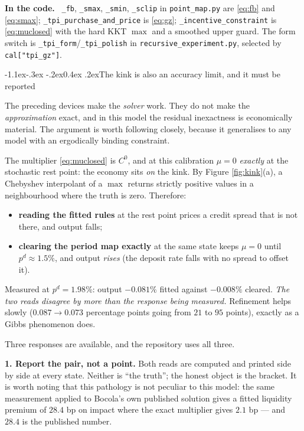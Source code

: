 \documentclass[10pt,a4paper]{article}
\makeatletter
\theoremstyle{definition}
\theoremstyle{plain}
\theoremstyle{remark}
\newenvironment{codehint}%
  {\par\vspace{2pt}\begin{framed}\noindent\small\textcolor{codeblue}{\textbf{In the code.}}\ }%
  {\end{framed}\vspace{2pt}}
\newcommand{\file}[1]{\textcolor{codeblue}{\texttt{#1}}}
\newcommand{\code}[1]{\texttt{#1}}
\renewcommand\subsection{\@startsection{subsection}{2}{\z@}%
  {-1.1ex\@plus -.3ex \@minus -.2ex}{0.4ex \@plus .2ex}{\normalfont\normalsize\bfseries}}
\makeatother
\begin{document}
\begin{codehint}
\code{\_fb}, \code{\_smax}, \code{\_smin}, \code{\_sclip} in \file{point\_map.py} are
\eqref{eq:fb} and \eqref{eq:smax}; \code{\_tpi\_purchase\_and\_price} is \eqref{eq:gz};
\code{\_incentive\_constraint} is \eqref{eq:muclosed} with the hard KKT $\max$ and a smoothed
upper guard. The form switch is \code{\_tpi\_form}/\code{\_tpi\_polish} in
\file{recursive\_experiment.py}, selected by \code{cal["tpi\_gz"]}.
\end{codehint}

\subsection{The kink is also an accuracy limit, and it must be reported}
\label{sec:kink}

The preceding devices make the \emph{solver} work. They do not make the \emph{approximation}
exact, and in this model the residual inexactness is economically material. The argument is
worth following closely, because it generalises to any model with an ergodically binding
constraint.

The multiplier \eqref{eq:muclosed} is $C^0$, and at this calibration $\mu = 0$ \emph{exactly}
at the stochastic rest point: the economy sits \emph{on} the kink. By Figure
\ref{fig:kink}(a), a Chebyshev interpolant of a $\max$ returns strictly positive values in a
neighbourhood where the truth is zero. Therefore:
\begin{itemize}
\item \textbf{reading the fitted rules} at the rest point prices a credit spread that is not
there, and output falls;
\item \textbf{clearing the period map exactly} at the same state keeps $\mu=0$ until
$p^d\approx1.5\%$, and output \emph{rises} (the deposit rate falls with no spread to offset
it).
\end{itemize}
Measured at $p^d = 1.98\%$: output $-0.081\%$ fitted against $-0.008\%$ cleared. \emph{The two
reads disagree by more than the response being measured.} Refinement helps slowly
($0.087\to0.073$ percentage points going from $21$ to $95$ points), exactly as a Gibbs
phenomenon does.

Three responses are available, and the repository uses all three.

\textbf{1. Report the pair, not a point.} Both reads are computed and printed side by side at
every state. Neither is ``the truth''; the honest object is the bracket. It is worth noting
that this pathology is not peculiar to this model: the same measurement applied to Bocola's
own published solution gives a fitted liquidity premium of $28.4$ bp on impact where the exact
multiplier gives $2.1$ bp --- and $28.4$ is the published number.
\end{document}
